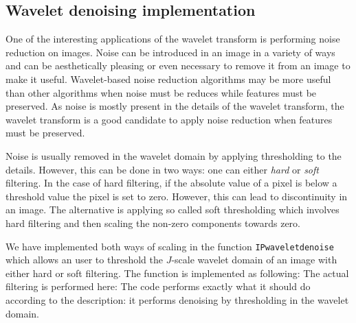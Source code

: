 \subsection{Wavelet denoising implementation}
One of the interesting applications of the wavelet transform is performing noise reduction on images. Noise can be introduced in an image in a variety of ways and can be aesthetically pleasing or even necessary to remove it from an image to make it useful. Wavelet-based noise reduction algorithms may be more useful than other algorithms when noise must be reduces while features must be preserved. As noise is mostly present in the details of the wavelet transform, the wavelet transform is a good candidate to apply noise reduction when features must be preserved.

Noise is usually removed in the wavelet domain by applying thresholding to the details. However, this can be done in two ways: one can either \textit{hard} or \textit{soft} filtering. In the case of hard filtering, if the absolute value of a pixel is below a threshold value the pixel is set to zero. However, this can lead to discontinuity in an image. The alternative is applying so called soft thresholding which involves hard filtering and then scaling the non-zero components towards zero. 

We have implemented both ways of scaling in the function \texttt{IPwaveletdenoise} which allows an user to threshold the $J$-scale wavelet domain of an image with either hard or soft filtering. The function is implemented as following:
The actual filtering is performed here:
The code performs exactly what it should do according to the description: it performs denoising by thresholding in the wavelet domain. 
